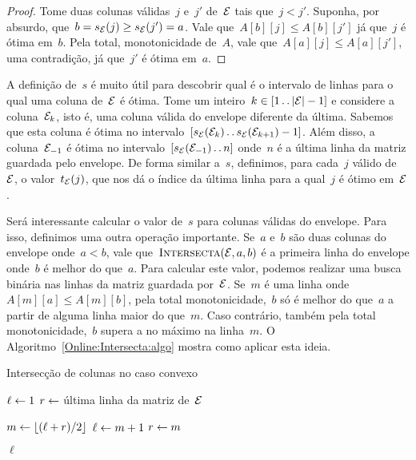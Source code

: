 \begin{proof}
Tome duas colunas válidas~$j$ e~$j'$ de~$\mathcal{E}$ tais que~$j < j'$. Suponha, por absurdo,  que~${b  = s_{\mathcal{E}}(j) \geq s_{\mathcal{E}}(j') = a}$. Vale que~$A[b][j] \leq A[b][j']$ já que~$j$ é ótima em~$b$. Pela total, monotonicidade de~$A$, vale que~$A[a][j] \leq A[a][j']$, uma contradição, já que~$j'$ é ótima em~$a$.
\end{proof}

A definição de~$s$ é muito útil para descobrir qual é o intervalo de linhas para o qual uma coluna de~$\mathcal{E}$ é ótima. Tome um inteiro~$k \in [1 \,.\,.\, |\mathcal{E}|-1]$ e considere a coluna~$\mathcal{E}_k$, isto é, uma coluna válida do envelope diferente da última. Sabemos que esta coluna é ótima no intervalo~$[s_{\mathcal{E}}(\mathcal{E}_k) \,.\,.\, s_{\mathcal{E}}(\mathcal{E}_{k+1}) - 1]$. Além disso, a coluna~$\mathcal{E}_{-1}$ é ótima no intervalo~$[s_{\mathcal{E}}(\mathcal{E}_{-1}) \,.\,.\, n]$ onde~$n$ é a última linha da matriz guardada pelo envelope. De forma similar a~$s$, definimos, para cada~$j$ válido de~$\mathcal{E}$, o valor~$t_{\mathcal{E}}(j)$, que nos dá o índice da última linha para a qual~$j$ é ótimo em~$\mathcal{E}$.

Será interessante calcular o valor de~$s$ para colunas válidas do envelope. Para isso, definimos uma outra operação importante. Se~$a$ e~$b$ são duas colunas do envelope onde~$a < b$, vale que~$\textsc{Intersecta}(\mathcal{E},a,b)$ é a primeira linha do envelope onde~$b$ é melhor do que~$a$. Para calcular este valor, podemos realizar uma busca binária nas linhas da matriz guardada por~$\mathcal{E}$. Se~$m$ é uma linha onde~$A[m][a] \leq A[m][b]$, pela total monotonicidade,~$b$ só é melhor do que~$a$ a partir de alguma linha maior do que~$m$. Caso contrário, também pela total monotonicidade,~$b$ supera a no máximo na linha~$m$. O Algoritmo~\ref{Online:Intersecta:algo} mostra como aplicar esta ideia.

\begin{algorithm}[h]
\caption{Intersecção de colunas no caso convexo}
\label{Online:Intersecta:algo}
\begin{algorithmic}[1]
    \State $\ell \leftarrow 1$
    \State $r \leftarrow $ última linha da matriz de~$\mathcal{E}$

        \State $m \leftarrow \lfloor(\ell+r)/2\rfloor$
         \label{Online:Intersecta:algo:comp}
            \State $\ell \leftarrow m + 1$
        \Else
            \State $r \leftarrow m$
        \EndIf
    \EndWhile

    \State \Return $\ell$
\EndFunction
\end{algorithmic}
\end{algorithm}

